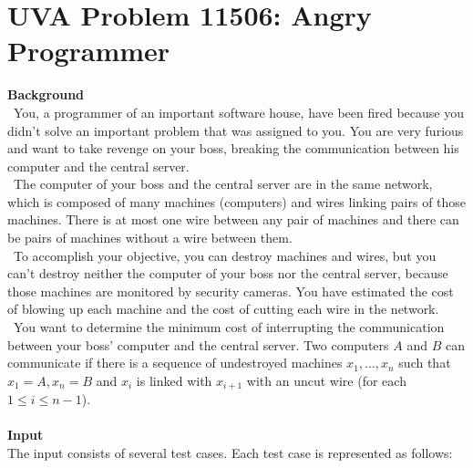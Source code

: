 \documentclass[12pt]{article}
\begin{document}
\section{UVA Problem 11506: Angry Programmer}
\textbf{Background} \\
~\indent You, a programmer of an important software house, have been fired because you
didn't solve an important problem that was assigned to you. You are very furious
and want to take revenge on your boss, breaking the communication between his
computer
and the central server. \\
~\indent The computer of your boss and the central server are in the same network, which
is composed of many machines (computers) and wires linking pairs of those machines.
There is at most one wire between any pair of machines and there can be pairs of
machines without a wire between them. \\
~\indent To accomplish your objective, you can destroy machines and wires, but you can't
destroy neither the computer of your boss nor the central server, because those machines
are monitored by security cameras. You have estimated the cost of blowing up
each machine and the cost of cutting each wire in the network. \\
~\indent You want to determine the minimum cost of interrupting the communication between
your boss' computer and the central server. Two computers $A$ and $B$ can
communicate if there is a sequence of undestroyed machines $x_1,...,x_n$ such that
$x_1 = A, x_n = B$ and $x_i$ is linked with $x_{i+1}$ with an uncut wire (for each $1 \leq i \leq n - 1$). \\ \\
\textbf{Input} \\
The input consists of several test cases. Each test case is represented as follows:
\end{document}
